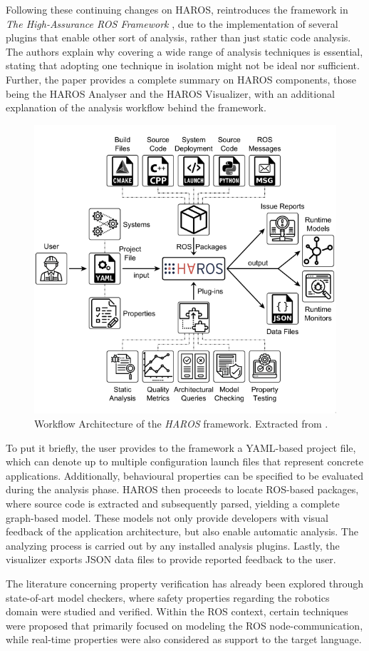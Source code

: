 Following these continuing changes on HAROS, \citeauthor*{santos2021high} reintroduces the framework in \textit{The High-Assurance ROS Framework} \cite{santos2021high}, due to the implementation of several plugins that enable other sort of analysis, rather than just static code analysis. The authors explain why covering a wide range of analysis techniques is essential, stating that adopting one technique in isolation might not be ideal nor sufficient. Further, the paper provides a complete summary on HAROS components, those being the HAROS Analyser and the HAROS Visualizer, with an additional explanation of the analysis workflow behind the framework. 

\begin{figure}[H]
    \centering
    \includegraphics[width=0.6\linewidth]{img/haros_framework.png}
    \caption{Workflow Architecture of the \textit{HAROS} framework. Extracted from \cite{santos2021high}.}
    \label{fig:haros-framework}
\end{figure}

To put it briefly, the user provides to the framework a YAML-based project file, which can denote up to multiple configuration launch files that represent concrete applications. Additionally, behavioural properties can be specified to be evaluated during the analysis phase. HAROS then proceeds to locate ROS-based packages, where source code is extracted and subsequently parsed, yielding a complete graph-based model. These models not only provide developers with visual feedback of the application architecture, but also enable automatic analysis. The analyzing process is carried out by any installed analysis plugins. Lastly, the visualizer exports JSON data files to provide reported feedback to the user.

The literature concerning property verification has already been explored through state-of-art model checkers, where safety properties regarding the robotics domain were studied and verified. Within the ROS context, certain techniques were proposed that primarily focused on modeling the ROS node-communication, while real-time properties were also considered as support to the target language.
 

